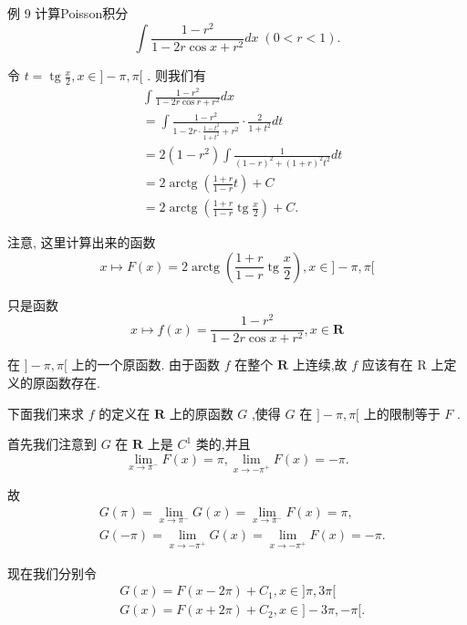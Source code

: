例 9 计算Poisson积分
$$\int \frac{1 - {r}^{2}}{1 - {2r}\cos x + {r}^{2}}{dx}\;\left( {0 < r < 1}\right) .$$

令 $t = \operatorname{tg}\frac{x}{2},x \in  \rbrack  - \pi ,\pi \lbrack$ . 则我们有
\begin{align*}
	&\int \frac{1 - {r}^{2}}{1 - {2r}\cos r + {r}^{2}}{dx}\\
	&= \int \frac{1 - {r}^{2}}{1 - {2r} \cdot  \frac{1 - {t}^{2}}{1 + {t}^{2}} + {r}^{2}} \cdot  \frac{2}{1 + {t}^{2}}{dt}\\
	&= 2\left( {1 - {r}^{2}}\right) \int \frac{1}{{\left( 1 - r\right) }^{2} + {\left( 1 + r\right) }^{2}{t}^{2}}{dt}\\
	&= 2\operatorname{arctg}\left( {\frac{1 + r}{1 - r}t}\right)  + C\\
	&= 2\operatorname{arctg}\left( {\frac{1 + r}{1 - r}\operatorname{tg}\frac{x}{2}}\right)  + C.
\end{align*}

注意, 这里计算出来的函数
$$x \mapsto  F\left( x\right)  = 2\operatorname{arctg}\left( {\frac{1 + r}{1 - r}\operatorname{tg}\frac{x}{2}}\right) ,x \in  \rbrack  - \pi ,\pi \lbrack$$

只是函数
$$x \mapsto  f\left( x\right)  = \frac{1 - {r}^{2}}{1 - {2r}\cos x + {r}^{2}},x \in  \mathbf{R}$$

在 $\rbrack  - \pi ,\pi \lbrack$ 上的一个原函数. 由于函数 $f$ 在整个 $\mathbf{R}$ 上连续,故 $f$ 应该有在 $\mathrm{R}$ 上定义的原函数存在.

下面我们来求 $f$ 的定义在 $\mathbf{R}$ 上的原函数 $G$ ,使得 $G$ 在 $\rbrack  - \pi ,\pi \lbrack$ 上的限制等于 $F$ .

首先我们注意到 $G$ 在 $\mathbf{R}$ 上是 ${C}^{1}$ 类的,并且
$$\mathop{\lim }\limits_{{x \rightarrow  {\pi }^{ - }}}F\left( x\right)  = \pi ,\mathop{\lim }\limits_{{x \rightarrow   - {\pi }^{ + }}}F\left( x\right)  =  - \pi .$$

故
\begin{align*}
	&G\left( \pi \right)  = \mathop{\lim }\limits_{{x \rightarrow  {\pi }^{ - }}}G\left( x\right)  = \mathop{\lim }\limits_{{x \rightarrow  {\pi }^{ - }}}F\left( x\right)  = \pi ,\\
	&G\left( {-\pi }\right)  = \mathop{\lim }\limits_{{x \rightarrow   - {\pi }^{ + }}}G\left( x\right)  = \mathop{\lim }\limits_{{x \rightarrow   - {\pi }^{ + }}}F\left( x\right)  =  - \pi .
\end{align*}

现在我们分别令
\begin{align*}
	&G\left( x\right)  = F\left( {x - {2\pi }}\right)  + {C}_{1},x \in  \rbrack \pi ,{3\pi }\lbrack\\
	&G\left( x\right)  = F\left( {x + {2\pi }}\right)  + {C}_{2},x \in  \rbrack  - {3\pi }, - \pi \lbrack .
\end{align*}

